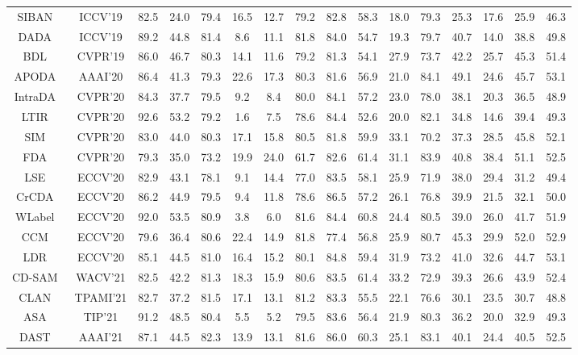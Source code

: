 \documentclass[journal]{IEEEtran}
\begin{document}
{\begin{minipage}{\textwidth}
\begin{table*}[t]
{\begin{tabular}{c|c|ccccccccccccc|c}
\toprule
SIBAN~\cite{SIBAN}&ICCV'19 &82.5 &24.0 &79.4 &16.5 &12.7 &79.2 &82.8 &58.3 &18.0 &79.3 &25.3 &17.6 &25.9 &46.3 \\
DADA~\cite{DADA}&ICCV'19 &89.2 &44.8 &81.4 &8.6 &11.1 &81.8 &84.0 &54.7 &19.3 &79.7 &40.7 &14.0 &38.8  &49.8 \\
BDL~\cite{BDL}&CVPR'19 &86.0 &46.7 &80.3 &14.1 &11.6 &79.2 &81.3 &54.1 &27.9 &73.7 &42.2 &25.7 &45.3  &51.4 \\
APODA~\cite{APODA}&AAAI'20 &86.4 &41.3 &79.3 &22.6 &17.3 &80.3 &81.6 &56.9 &21.0 &84.1 &49.1 &24.6 &45.7  &53.1 \\
IntraDA~\cite{IntraDA}&CVPR'20 &84.3 &37.7 &79.5 &9.2 &8.4 &80.0 &84.1 &57.2 &23.0 &78.0 &38.1 &20.3 &36.5 &48.9 \\
LTIR~\cite{LTIR}&CVPR'20 &92.6 &53.2 &79.2 &1.6 &7.5 &78.6 &84.4 &52.6 &20.0 &82.1 &34.8 &14.6 &39.4  &49.3 \\
SIM~\cite{SIM}&CVPR'20 &83.0 &44.0 &80.3 & 17.1 &15.8 &80.5 &81.8 &59.9 &33.1 &70.2 &37.3 &28.5 &45.8  &52.1 \\
FDA~\cite{FDA}&CVPR'20 & 79.3 &35.0 &73.2 &19.9 &24.0 &61.7 &82.6 &61.4 &31.1 &83.9 &40.8 &38.4 &51.1  &52.5\\
LSE~\cite{LSE}&ECCV'20 &82.9 &43.1 &78.1 &9.1 &14.4 &77.0 &83.5 &58.1 &25.9 &71.9 &38.0 &29.4 &31.2  &49.4 \\
CrCDA~\cite{CrCDA}&ECCV'20 &86.2 &44.9 &79.5 &9.4 &11.8 &78.6 &86.5 &57.2 &26.1 &76.8 &39.9 &21.5 &32.1  &50.0 \\
WLabel~\cite{WLabel}&ECCV'20 &92.0 &53.5 &80.9 &3.8 &6.0 &81.6 &84.4 &60.8 &24.4 &80.5 &39.0 &26.0 &41.7  &51.9 \\
CCM~\cite{CCM}&ECCV'20 &79.6 &36.4 &80.6 &22.4 &14.9 &81.8 &77.4 &56.8 &25.9 &80.7 &45.3 &29.9 &52.0  &52.9 \\
LDR~\cite{LDR}&ECCV'20 &85.1 &44.5 &81.0 &16.4 &15.2 &80.1 &84.8 &59.4 &31.9 &73.2 &41.0 &32.6 &44.7 &53.1 \\
CD-SAM~\cite{yang2021context} &WACV'21 &82.5 &42.2 &81.3 &18.3 &15.9 &80.6 &83.5 &61.4 &33.2 &72.9 &39.3 &26.6 &43.9 &52.4\\
CLAN~\cite{CLANv2} &TPAMI'21 &82.7 &37.2 &81.5 &17.1 &13.1 &81.2 &83.3 &55.5 &22.1 &76.6 &30.1 &23.5 &30.7 &48.8\\
ASA~\cite{ASA} &TIP'21 &91.2 &48.5 &80.4 &5.5 &5.2 &79.5 &83.6 &56.4 &21.9 &80.3 &36.2 &20.0 &32.9 &49.3\\
DAST~\cite{DAST}&AAAI'21 &87.1 &44.5 &82.3 &13.9 &13.1
&81.6 &86.0 &60.3 &25.1 &83.1 &40.1 &24.4 &40.5 &52.5\\

\end{tabular}}
\end{table*}
\end{minipage}}
\end{document}
